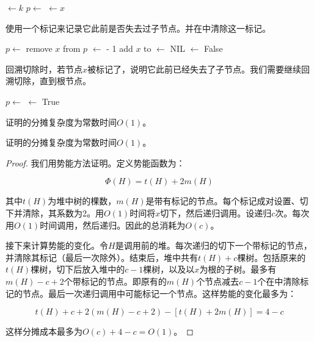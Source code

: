 \documentclass[b5paper]{ctexart}
\begin{document}
\begin{algorithmic}[1]
  \State {} $\gets k$
  \State $p \gets $ 
    \State {}
    \State {} 
  \EndIf
    \State {} $\gets x$
  \EndIf
\EndFunction
\end{algorithmic}

使用一个标记来记录它此前是否失去过子节点。并在中清除这一标记。

\begin{algorithmic}[1]
  \State $p \gets $ 
  \State remove $x$ from $p$
  \State {} $\gets$  - 1
  \State add $x$ to 
  \State {} $\gets$ NIL
  \State {} $\gets$ False
\EndFunction
\end{algorithmic}

回溯切除时，若节点$x$被标记了，说明它此前已经失去了子节点。我们需要继续回溯切除，直到根节点。

\begin{algorithmic}[1]
  \State $p \gets $ 
      \State {} $\gets$ True
    \Else
      \State {}
      \State {}
    \EndIf
  \EndIf
\EndFunction
\end{algorithmic}

\begin{Exercise}\label{ex:fibo-heap-decrease}
证明的分摊复杂度为常数时间$O(1)$。
\end{Exercise}

\begin{Answer}[ref = {ex:fibo-heap-decrease}]
证明的分摊复杂度为常数时间$O(1)$。

\begin{proof}
我们用势能方法证明。定义势能函数为：

\[
\Phi(H) = t(H) + 2m(H)
\]

其中$t(H)$为堆中树的棵数，$m(H)$是带有标记的节点。每个标记成对设置、切下并清除，其系数为2。用$O(1)$时间将$x$切下，然后递归调用。设递归$c$次。每次用$O(1)$时间调用，然后递归。因此的总消耗为$O(c)$。

接下来计算势能的变化。令$H$是调用前的堆。每次递归的切下一个带标记的节点，并清除其标记（最后一次除外）。结束后，堆中共有$t(H) + c$棵树。包括原来的$t(H)$棵树，切下后放入堆中的$c-1$棵树，以及以$x$为根的子树。最多有$m(H) - c + 2$个带标记的节点。即原有的$m(H)$个节点减去$c -1$个在中清除标记的节点。最后一次递归调用中可能标记一个节点。这样势能的变化最多为：

\[
t(H) + c + 2(m(H) - c + 2) - [t(H) + 2m(H)] = 4 - c
\]

这样分摊成本最多为$O(c) + 4 - c = O(1)$。
\end{proof}
\end{Answer}
\end{document}
